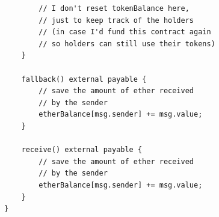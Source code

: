 \documentclass[12pt,addpoints,answers]{exam}
\begin{document}
\begin{questions}
\begin{parts}
\begin{solution}
\begin{verbatim}
        // I don't reset tokenBalance here,
        // just to keep track of the holders
        // (in case I'd fund this contract again
        // so holders can still use their tokens)
    }

    fallback() external payable {
        // save the amount of ether received
        // by the sender
        etherBalance[msg.sender] += msg.value;
    }

    receive() external payable {
        // save the amount of ether received
        // by the sender
        etherBalance[msg.sender] += msg.value;
    }
}
\end{verbatim}

\end{solution}

\end{parts}

\newpage


~\\

\end{questions}
\end{document}
